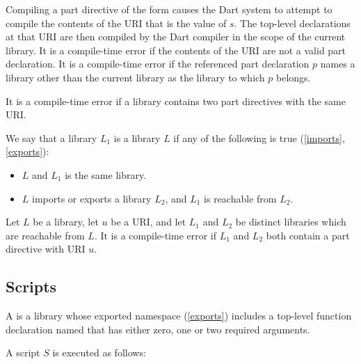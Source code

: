 \documentclass[makeidx]{article}
\begin{document}
{\LMHash{}%
Compiling a part directive of the form 
causes the Dart system to attempt to compile the contents of
the URI that is the value of $s$.
The top-level declarations at that URI are then compiled by the Dart compiler
in the scope of the current library.
It is a compile-time error if the contents of the URI are not
a valid part declaration.
It is a compile-time error if the referenced part declaration $p$ names
a library other than the current library as the library to which $p$ belongs.

\LMHash{}%
It is a compile-time error if a library contains
two part directives with the same URI.

\LMHash{}%
We say that a library $L_1$ is  a library $L$ if
any of the following is true (\ref{imports}, \ref{exports}):
\begin{itemize}
\item $L$ and $L_1$ is the same library.
\item $L$ imports or exports a library $L_2$, and $L_1$ is reachable from $L_2$.
\end{itemize}

\LMHash{}%
Let $L$ be a library, let $u$ be a URI,
and let $L_1$ and $L_2$ be distinct libraries which are reachable from $L$.
It is a compile-time error if $L_1$ and $L_2$ both contain
a part directive with URI $u$.



\subsection{Scripts}

\LMHash{}%
A  is a library whose exported namespace (\ref{exports}) includes
a top-level function declaration named 
that has either zero, one or two required arguments.

A script $S$ is executed as follows:

}
\end{document}
